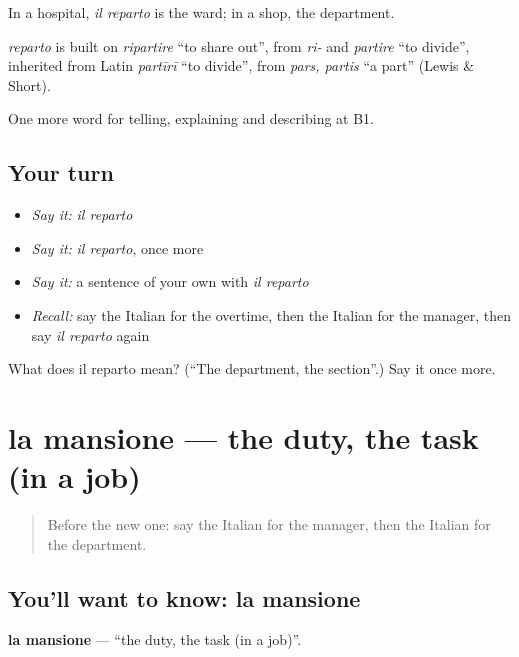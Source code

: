 In a hospital, \emph{il reparto} is the ward; in a shop, the department.

\begin{cousinweb}
\emph{reparto} is built on \emph{ripartire} \textquotedblleft{}to share out\textquotedblright{}, from \emph{ri-} and \emph{partire} \textquotedblleft{}to divide\textquotedblright{}, inherited from Latin \emph{partīrī} \textquotedblleft{}to divide\textquotedblright{}, from \emph{pars, partis} \textquotedblleft{}a part\textquotedblright{} (Lewis \& Short).
\end{cousinweb}

\begin{grammarlens}[title={What you've built}]
One more word for telling, explaining and describing at B1.
\end{grammarlens}

\subsection*{Your turn}
\begin{itemize}
\raggedright
  \item \emph{Say it:} \emph{il reparto}
  \item \emph{Say it:} \emph{il reparto}, once more
  \item \emph{Say it:} a sentence of your own with \emph{il reparto}
  \item \emph{Recall:} say the Italian for the overtime, then the Italian for the manager, then say \emph{il reparto} again
\end{itemize}

\begin{tcolorbox}[breakable,colback=teal!4,colframe=teal!35!black,title={Before you move on}]
What does il reparto mean? (\textquotedblleft{}The department, the section\textquotedblright{}.) Say it once more.
\end{tcolorbox}
\section[la mansione]{la mansione — the duty, the task (in a job)}

\label{lesson:IT-C360-mansione}



\begin{quote}
Before the new one: say the Italian for the manager, then the Italian for the department.
\end{quote}

\subsection*{You'll want to know: la mansione}
\textbf{la mansione} — \textquotedblleft{}the duty, the task (in a job)\textquotedblright{}.

